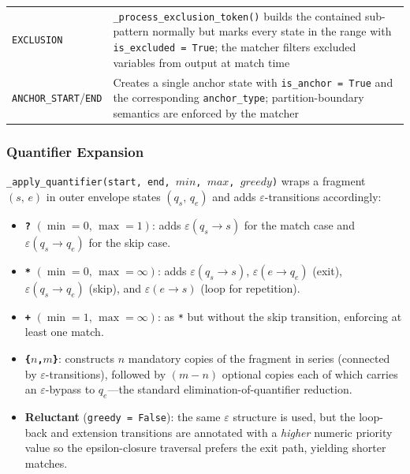 \begin{table}[htbp]
\begin{tabular}{lp{8.2cm}}
    \texttt{EXCLUSION}             & \texttt{\_process\_exclusion\_token()} builds
                                     the contained sub-pattern normally but marks
                                     every state in the range with
                                     \texttt{is\_excluded = True}; the matcher
                                     filters excluded variables from output at
                                     match time \\[4pt]
    \texttt{ANCHOR\_START}/\texttt{END}
                                   & Creates a single anchor state with
                                     \texttt{is\_anchor = True} and the
                                     corresponding \texttt{anchor\_type};
                                     partition-boundary semantics are enforced
                                     by the matcher \\
    \bottomrule
  \end{tabular}
\end{table}

\subsubsection{Quantifier Expansion}
\label{subsubsec:meth-apply-quantifier}

\texttt{\_apply\_quantifier(start, end, }$\mathit{min}$\texttt{, }$\mathit{max}$\texttt{, }$\mathit{greedy}$\texttt{)}
wraps a fragment $(s,\,e)$ in outer envelope states $(q_s,\,q_e)$
and adds $\varepsilon$-transitions accordingly:

\begin{itemize}
  \item \textbf{\texttt{?}} $(\min=0,\,\max=1)$: adds
    $\varepsilon(q_s \to s)$ for the match case and
    $\varepsilon(q_s \to q_e)$ for the skip case.
  \item \textbf{\texttt{*}} $(\min=0,\,\max=\infty)$: adds
    $\varepsilon(q_s \to s)$, $\varepsilon(e \to q_e)$ (exit),
    $\varepsilon(q_s \to q_e)$ (skip), and
    $\varepsilon(e \to s)$ (loop for repetition).
  \item \textbf{\texttt{+}} $(\min=1,\,\max=\infty)$: as \texttt{*}
    but without the skip transition, enforcing at least one match.
  \item \textbf{\texttt{\{$n$,$m$\}}}: constructs $n$ mandatory
    copies of the fragment in series (connected by
    $\varepsilon$-transitions), followed by $(m-n)$ optional copies
    each of which carries an $\varepsilon$-bypass to $q_e$—the
    standard elimination-of-quantifier reduction.
  \item \textbf{Reluctant} (\texttt{greedy = False}): the same
    $\varepsilon$ structure is used, but the loop-back and
    extension transitions are annotated with a \emph{higher}
    numeric priority value so the epsilon-closure traversal
    prefers the exit path, yielding shorter matches.
\end{itemize}

